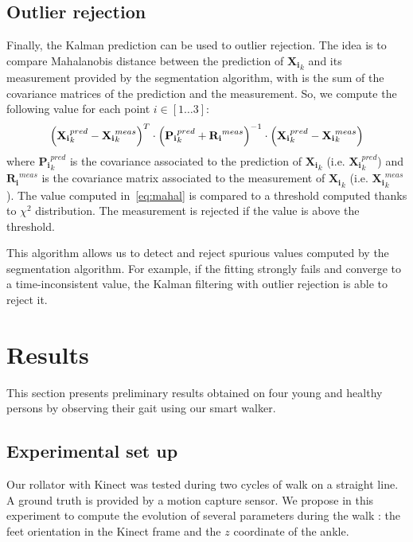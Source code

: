\documentclass[letterpaper, 10 pt, conference]{ieeeconf}
\newcommand{\CJOK}[2]{{#1}} %
\begin{document}
\subsection{Outlier rejection}
Finally, the Kalman  prediction can be \CJOK{used}{applied} to outlier rejection. The idea is to compare Mahalanobis distance between the prediction of $\mathbf{X_i}_k$ and its measurement provided by the segmentation algorithm, with is the sum of the covariance matrices of the prediction and the measurement. So, we compute the following value for each point $i\in[1\dots 3]$:
\begin{equation}
	\tiny
	\left(
		\mathbf{X_i}_k^{pred} - \mathbf{X_i}_k^{meas}
	\right)^T\cdot
	\left(
		\mathbf{P_i}_k^{pred} + \mathbf{R_i}^{meas}
	\right)^{-1}\cdot
	\left(
		\mathbf{X_i}_k^{pred} - \mathbf{X_i}_k^{meas}
	\right)
	\label{eq:mahal}
\end{equation}
where $\mathbf{P_i}_k^{pred}$ is the covariance associated to the prediction of $\mathbf{X_i}_k$ (i.e. $\mathbf{X_i}_k^{pred}$) and $\mathbf{R_i}^{meas}$ is the covariance matrix associated to the measurement of $\mathbf{X_i}_k$ (i.e. $\mathbf{X_i}_k^{meas}$). The value computed in~\ref{eq:mahal} is compared to a threshold computed thanks to $\chi^2$ distribution. The measurement is rejected if the value is above the threshold. 

This algorithm allows us to detect and reject spurious values computed by the segmentation algorithm. For example, if the fitting strongly fails and converge to a time-inconsistent value, the Kalman filtering with outlier rejection is able to reject it.
\section{Results}
This section presents preliminary results obtained on four young and healthy persons by observing their gait using our smart walker.

\subsection{Experimental set up}
Our rollator with Kinect was tested  during two cycles of walk on a straight line. A ground truth is provided by a motion capture sensor. We propose in this experiment to compute the evolution of several parameters during the walk : the feet orientation in the Kinect frame  and the $z$ coordinate of the ankle.
\end{document}
